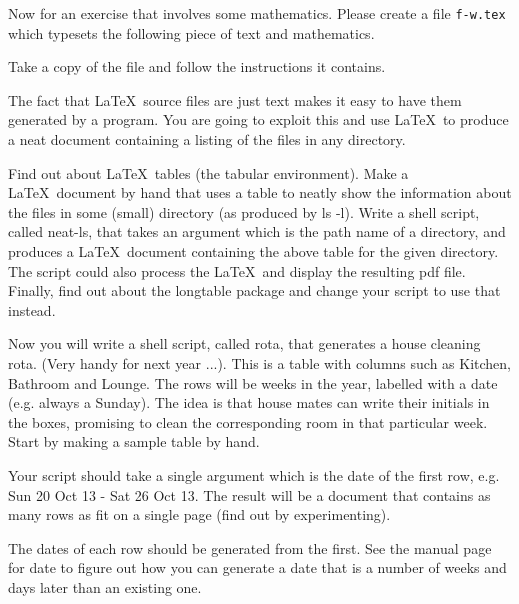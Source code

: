 \begin{refsection}
\label{sec:exercise-maths}

 Now for an exercise that involves some mathematics. Please create a file \texttt{f-w.tex} which typesets the following piece of text and mathematics.
\begin{quote}
  
\end{quote}



Take a copy of the file  and follow the instructions it contains.

The fact that \LaTeX\ source files are just text makes it easy to have them generated by a program. You are going to exploit this and use \LaTeX\ to produce a neat document containing a listing of the files in any directory.

Find out about \LaTeX\ tables (the tabular environment).
Make a \LaTeX\ document by hand that uses a table to neatly show the information about the files in some (small) directory (as produced by ls -l).
Write a shell script, called neat-ls, that takes an argument which is the path name of a directory, and produces a \LaTeX\ document containing the above table for the given directory. The script could also process the \LaTeX\ and display the resulting pdf file.
Finally, find out about the longtable package and change your script to use that instead.

Now you will write a shell script, called rota, that generates a house cleaning rota. (Very handy for next year ...). This is a table with columns such as Kitchen, Bathroom and Lounge. The rows will be weeks in the year, labelled with a date (e.g. always a Sunday). The idea is that house mates can write their initials in the boxes, promising to clean the corresponding room in that particular week. Start by making a sample table by hand.

Your script should take a single argument which is the date of the first row, e.g. Sun 20 Oct 13 - Sat 26 Oct 13. The result will be a document that contains as many rows as fit on a single page (find out by experimenting).

The dates of each row should be generated from the first. See the manual page for date to figure out how you can generate a date that is a number of weeks and days later than an existing one.



\end{refsection}
